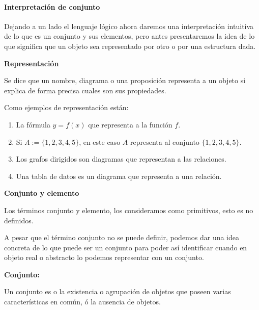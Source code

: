 \paragraph{Interpretación de conjunto}

Dejando a un lado el lenguaje lógico ahora daremos una interpretación
intuitiva de lo que es un conjunto y sus elementos, pero antes presentaremos
la idea de lo que significa que un objeto sea representado por otro
o por una estructura dada.

\vspace*{-100pt}\begin{ideabox}{\bf Representación}

Se dice que un nombre, diagrama o una proposición representa a un
objeto si explica de forma precisa cuales son sus propiedades. 

\end{ideabox}

Como ejemplos de representación están:
\begin{enumerate}
\item La fórmula $y=f(x)$ que representa a la función $f$.
\item Si $A:=\{1,2,3,4,5\}$, en este caso $A$ representa al conjunto $\{1,2,3,4,5\}.$
\item Los grafos dirigidos son diagramas que representan a las relaciones.
\item Una tabla de datos es un diagrama que representa a una relación.
\end{enumerate}
\vspace*{-70pt}\begin{apunte}{\bf Conjunto y elemento}

Los términos conjunto y elemento, los consideramos como primitivos,
esto es no definidos. 

\end{apunte}

A pesar que el término conjunto no se puede definir, podemos dar una
idea concreta de lo que puede ser un conjunto para poder así identificar
cuando en objeto real o abstracto lo podemos representar con un conjunto.

\vspace*{-70pt}\begin{ideabox}{\bf Conjunto:}\textsf{ }

\textsf{Un conjunto es o la existencia o agrupación de objetos que
poseen varias características en común, ó la ausencia de }objetos.\end{ideabox} 

